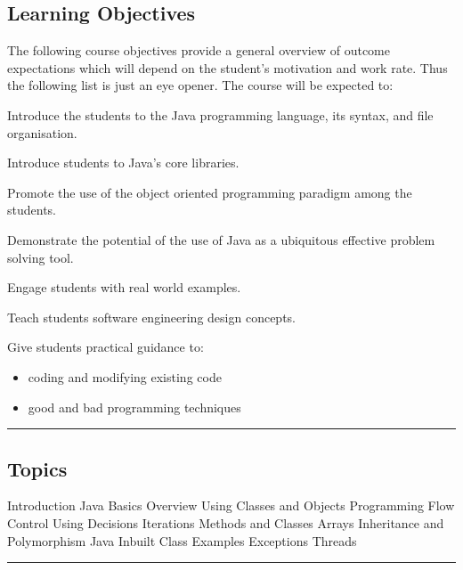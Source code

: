 \subsection*{Learning Objectives}
The following course objectives provide a general overview of outcome expectations which will depend on the student’s motivation and work rate. Thus the following list is just an eye opener.
The course will be expected to:
\begin{outline}
    \1 Introduce the students to the Java programming language, its syntax, and file organisation.

    \1 Introduce students to Java’s core libraries.

    \1 Promote  the use of the object oriented programming paradigm among the students.

    \1 Demonstrate the potential of  the use of Java as a ubiquitous effective problem solving tool.

    \1 Engage students with real world examples.

    \1 Teach students software engineering design concepts.

    \1 Give students practical guidance to:
    \begin{itemize}
        \item coding and modifying existing code
        \item good and bad programming techniques
    \end{itemize}
\end{outline}
\vspace{2ex}\hrule\vspace{2ex}

\subsection*{Topics}
\begin{outline}
    \1 Introduction
    \1 Java Basics Overview
    \1 Using Classes and Objects
    \1 Programming Flow Control Using Decisions
    \1 Iterations
    \1 Methods and Classes
    \1 Arrays
    \1 Inheritance and Polymorphism
    \1 Java Inbuilt Class Examples
    \1 Exceptions
    \1 Threads
\end{outline}
\vspace{2ex} \hrule\vspace{2ex}

